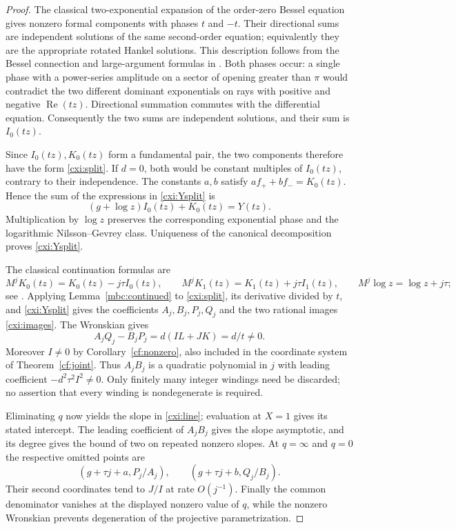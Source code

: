 \documentclass[11pt]{article}
\theoremstyle{definition}
\theoremstyle{remark}
\begin{document}
\begin{proof}
The classical two-exponential expansion of the order-zero Bessel
equation gives nonzero formal components with phases $t$ and $-t$.
Their directional sums are independent solutions of the same
second-order equation; equivalently they are the appropriate rotated
Hankel solutions.  This description follows from the Bessel connection
and large-argument formulas in \cite[Sections 10.17, 10.27, and 10.40]{DLMF}.
Both phases occur: a single phase with a power-series amplitude on a
sector of opening greater than $\pi$ would contradict the two different
dominant exponentials on rays with positive and negative
$\operatorname{Re}(tz)$.  Directional summation commutes with the
differential equation.  Consequently the two sums are independent
solutions, and their sum is $I_0(tz)$.

Since $I_0(tz),K_0(tz)$ form a fundamental pair, the two components
therefore have the form \eqref{cxi:split}.  If $d=0$, both would be
constant multiples of $I_0(tz)$, contrary to their independence.
The constants $a,b$ satisfy $af_++bf_-=K_0(tz)$.  Hence the sum of
the expressions in \eqref{cxi:Ysplit} is
\[
 (g+\log z)I_0(tz)+K_0(tz)=Y(tz).
\]
Multiplication by $\log z$ preserves the corresponding exponential
phase and the logarithmic Nilsson--Gevrey class.  Uniqueness of the
canonical decomposition \cite[Theorem 2.3]{FR26} proves
\eqref{cxi:Ysplit}.

The classical continuation formulas are
\[
 M^jK_0(tz)=K_0(tz)-j\tau I_0(tz),\qquad
 M^jK_1(tz)=K_1(tz)+j\tau I_1(tz),
 \qquad M^j\log z=\log z+j\tau;
\]
see \cite[Section 10.34]{DLMF}.  Applying
Lemma~\ref{mbc:continued} to \eqref{cxi:split}, its derivative divided
by $t$, and \eqref{cxi:Ysplit} gives the coefficients $A_j,B_j,P_j,Q_j$
and the two rational images \eqref{cxi:images}.  The Wronskian gives
\[
 A_jQ_j-B_jP_j=d(IL+JK)=d/t\ne0.
\]
Moreover $I\ne0$ by Corollary~\ref{cf:nonzero}, also included in the
coordinate system of Theorem~\ref{cf:joint}.  Thus $A_jB_j$ is a
quadratic polynomial in $j$ with leading coefficient
$-d^2\tau^2I^2\ne0$.  Only finitely many integer windings need be
discarded; no assertion that every winding is nondegenerate is required.

Eliminating $q$ now yields the slope in \eqref{cxi:line}; evaluation
at $X=1$ gives its stated intercept.  The leading coefficient of
$A_jB_j$ gives the slope asymptotic, and its degree gives the bound
of two on repeated nonzero slopes.  At $q=\infty$ and $q=0$ the
respective omitted points are
\[
 (g+\tau j+a,P_j/A_j),\qquad (g+\tau j+b,Q_j/B_j).
\]
Their second coordinates tend to $J/I$ at rate $O(j^{-1})$.
Finally the common denominator vanishes at the displayed nonzero
value of $q$, while the nonzero Wronskian prevents degeneration of
the projective parametrization.
\end{proof}
\end{document}
